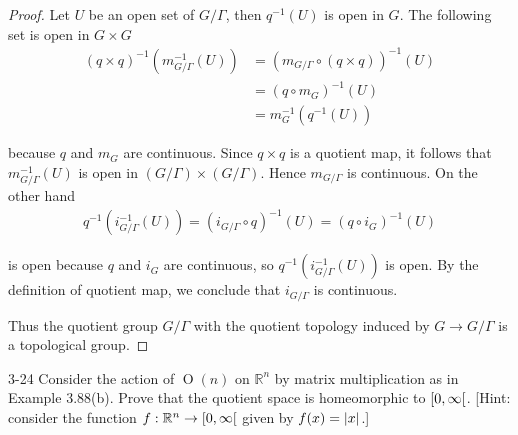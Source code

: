 \begin{proof}
    Let $U$ be an open set of $G/\Gamma$, then $q^{-1}(U)$ is open in $G$. The following set is open in $G\times G$
    \begin{align*}
        {(q \times q)}^{-1}(m_{G/\Gamma}^{-1}(U)) & = {(m_{G/\Gamma} \circ (q\times q))}^{-1}(U) \\
                                                  & = {(q\circ m_{G})}^{-1}(U)                   \\
                                                  & = m_{G}^{-1}(q^{-1}(U))
    \end{align*}

    because $q$ and $m_{G}$ are continuous. Since $q\times q$ is a quotient map, it follows that $m_{G/\Gamma}^{-1}(U)$ is open in $(G/\Gamma)\times (G/\Gamma)$. Hence $m_{G/\Gamma}$ is continuous. On the other hand
    \begin{align*}
        q^{-1}(i_{G/\Gamma}^{-1}(U)) = {(i_{G/\Gamma}\circ q)}^{-1}(U) = {(q\circ i_{G})}^{-1}(U)
    \end{align*}

    is open because $q$ and $i_{G}$ are continuous, so $q^{-1}(i_{G/\Gamma}^{-1}(U))$ is open. By the definition of quotient map, we conclude that $i_{G/\Gamma}$ is continuous.

    Thus the quotient group $G/\Gamma$ with the quotient topology induced by $G\to G/\Gamma$ is a topological group.
\end{proof}

\begin{problem}{3-24}
Consider the action of $\operatorname{O}(n)$ on $\mathbb{R}^{n}$ by matrix multiplication as in Example 3.88(b). Prove that the quotient space is homeomorphic to $\left[{0, \infty}\right[$. [Hint: consider the function $f: \mathbb{R}^{n} \to \left[{0, \infty}\right[$ given by $f(x) = \left\vert{x}\right\vert$.]
\end{problem}

